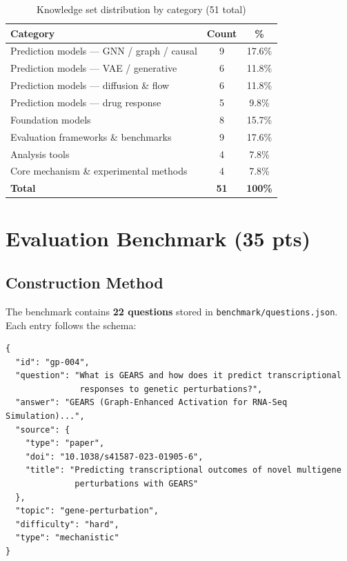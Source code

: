 \documentclass[12pt, a4paper]{article}
\begin{document}
\begin{table}[ht]
\centering
\caption{Knowledge set distribution by category (51 total)}
\begin{tabular}{lcc}
\toprule
\textbf{Category} & \textbf{Count} & \textbf{\%} \\
\midrule
Prediction models --- GNN / graph / causal & 9  & 17.6\% \\
Prediction models --- VAE / generative     & 6  & 11.8\% \\
Prediction models --- diffusion \& flow    & 6  & 11.8\% \\
Prediction models --- drug response        & 5  &  9.8\% \\
Foundation models                          & 8  & 15.7\% \\
Evaluation frameworks \& benchmarks        & 9  & 17.6\% \\
Analysis tools                             & 4  &  7.8\% \\
Core mechanism \& experimental methods     & 4  &  7.8\% \\
\midrule
\textbf{Total} & \textbf{51} & \textbf{100\%} \\
\bottomrule
\end{tabular}
\end{table}

\section{Evaluation Benchmark (35 pts)}

\subsection{Construction Method}

The benchmark contains \textbf{22 questions} stored in \texttt{benchmark/questions.json}.
Each entry follows the schema:

\begin{lstlisting}[caption={Benchmark question schema (gp-004)}]
{
  "id": "gp-004",
  "question": "What is GEARS and how does it predict transcriptional
               responses to genetic perturbations?",
  "answer": "GEARS (Graph-Enhanced Activation for RNA-Seq Simulation)...",
  "source": {
    "type": "paper",
    "doi": "10.1038/s41587-023-01905-6",
    "title": "Predicting transcriptional outcomes of novel multigene
              perturbations with GEARS"
  },
  "topic": "gene-perturbation",
  "difficulty": "hard",
  "type": "mechanistic"
}
\end{lstlisting}
\end{document}
